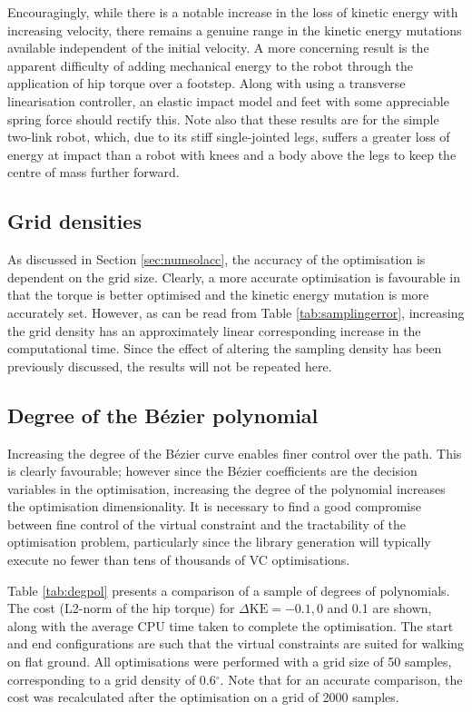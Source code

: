 Encouragingly, while there is a notable increase in the loss of kinetic energy with increasing velocity, there remains a genuine range in the kinetic energy mutations available independent of the initial velocity. A more concerning result is the apparent difficulty of adding mechanical energy to the robot through the application of hip torque over a footstep. Along with using a transverse linearisation controller, an elastic impact model and feet with some appreciable spring force should rectify this. Note also that these results are for the simple two-link robot, which, due to its stiff single-jointed legs, suffers a greater loss of energy at impact than a robot with knees and a body above the legs to keep the centre of mass further forward.

\subsection{Grid densities}
As discussed in Section \ref{sec:numsolacc}, the accuracy of the optimisation is dependent on the grid size. Clearly, a more accurate optimisation is favourable in that the torque is better optimised and the kinetic energy mutation is more accurately set. However, as can be read from Table \ref{tab:samplingerror}, increasing the grid density has an approximately linear corresponding increase in the computational time. Since the effect of altering the sampling density has been previously discussed, the results will not be repeated here.

\subsection{Degree of the Bézier polynomial}
Increasing the degree of the Bézier curve enables finer control over the path. This is clearly favourable; however since the Bézier coefficients are the decision variables in the optimisation, increasing the degree of the polynomial increases the optimisation dimensionality. It is necessary to find a good compromise between fine control of the virtual constraint and the tractability of the optimisation problem, particularly since the library generation will typically execute no fewer than tens of thousands of VC optimisations.

Table \ref{tab:degpol} presents a comparison of a sample of degrees of polynomials. The cost (L2-norm of the hip torque) for $\Delta\mathrm{KE}=-0.1,0$ and 0.1 are shown, along with the average CPU time taken to complete the optimisation. The start and end configurations are such that the virtual constraints are suited for walking on flat ground. All optimisations were performed with a grid size of 50 samples, corresponding to a grid density of 0.6$^\circ$. Note that for an accurate comparison, the cost was recalculated after the optimisation on a grid of 2000 samples.

